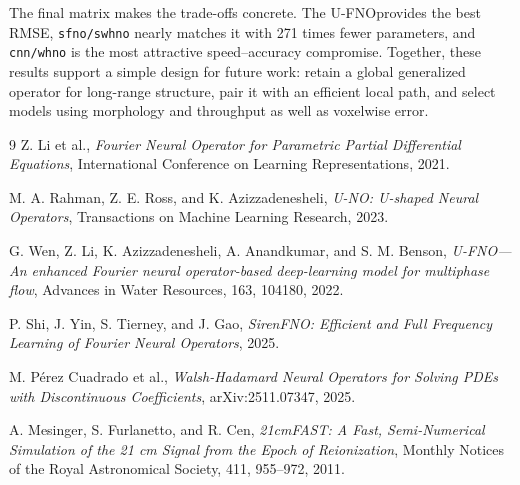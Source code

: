 \documentclass[11pt,a4paper]{article}
\newcommand{\UFNO}{\textsc{U-FNO}}
\newcommand{\code}[1]{\texttt{#1}}
\begin{document}
The final matrix makes the trade-offs concrete. The \UFNO provides the best
RMSE, \code{sfno/swhno} nearly matches it with 271 times fewer parameters, and
\code{cnn/whno} is the most attractive speed--accuracy compromise. Together,
these results support a simple design for future work: retain a global
generalized operator for long-range structure, pair it with an efficient local
path, and select models using morphology and throughput as well as voxelwise
error.

\begin{thebibliography}{9}
Z. Li et al.,
\emph{Fourier Neural Operator for Parametric Partial Differential Equations},
International Conference on Learning Representations, 2021.

M. A. Rahman, Z. E. Ross, and K. Azizzadenesheli,
\emph{U-NO: U-shaped Neural Operators},
Transactions on Machine Learning Research, 2023.

G. Wen, Z. Li, K. Azizzadenesheli, A. Anandkumar, and S. M. Benson,
\emph{U-FNO---An enhanced Fourier neural operator-based deep-learning model
for multiphase flow},
Advances in Water Resources, 163, 104180, 2022.

P. Shi, J. Yin, S. Tierney, and J. Gao,
\emph{SirenFNO: Efficient and Full Frequency Learning of Fourier Neural Operators},
2025.

M. Pérez Cuadrado et al.,
\emph{Walsh-Hadamard Neural Operators for Solving PDEs with Discontinuous
Coefficients}, arXiv:2511.07347, 2025.

A. Mesinger, S. Furlanetto, and R. Cen,
\emph{21cmFAST: A Fast, Semi-Numerical Simulation of the 21 cm Signal from the
Epoch of Reionization}, Monthly Notices of the Royal Astronomical Society,
411, 955--972, 2011.
\end{thebibliography}
\end{document}
